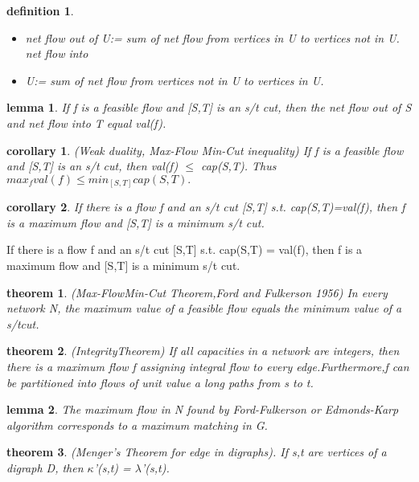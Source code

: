 \documentclass[twocolumn]{article}
\newtheorem{theorem}{theorem}[section]  %
\newtheorem{definition}{definition}
\newtheorem{lemma}{lemma}
\newtheorem{corollary}{corollary}
\begin{document}
\begin{CJK*}{UTF8}{bkai}
    \begin{definition}
        \begin{itemize}
            \item net flow out of U:= sum of net flow from vertices in U to vertices not in U.
 net flow into 
\item U:= sum of net flow from vertices not in U to vertices in U.
        \end{itemize}
    \end{definition}

    \begin{lemma}
         If f is a feasible flow and [S,T] is an s/t cut, then the net flow out of S and
 net flow into T equal val(f).
    \end{lemma}

    \begin{corollary}{(Weak duality, Max-Flow Min-Cut inequality)}
       If f is a feasible flow and [S,T] is an s/t cut, then val(f) $\leq$ cap(S,T). Thus
 $max_{f}  val(f) \leq min_{[S,T]} cap(S,T).$ 
    \end{corollary}

    \begin{corollary}
         If there is a flow f and an s/t cut [S,T] s.t. cap(S,T)=val(f), then f is a
 maximum flow and [S,T] is a minimum s/t cut.
    \end{corollary}
     If there is a flow f and an s/t cut [S,T] s.t. cap(S,T) = val(f), then f is a
 maximum flow and [S,T] is a minimum s/t cut.
    \begin{theorem}{(Max-FlowMin-Cut Theorem,Ford and
 Fulkerson 1956)}
         In every network N, the maximum value of a feasible flow equals the minimum
 value of a s/tcut.
    \end{theorem}

    \begin{theorem}{(IntegrityTheorem)}
        If all capacities in a network are integers, then there is a maximum flow f
 assigning integral flow to every edge.Furthermore,f can be partitioned into
 flows of unit value a long paths from s to t.
    \end{theorem}

    \begin{lemma}
         The maximum flow in N found by Ford-Fulkerson or Edmonds-Karp
 algorithm corresponds to a maximum matching in G.
    \end{lemma}

    \begin{theorem}{(Menger’s Theorem for edge in digraphs).}
        If s,t are vertices of a digraph D, then $\kappa$'(s,t) = $\lambda$'(s,t).
    \end{theorem}


\end{CJK*}
\end{document}
